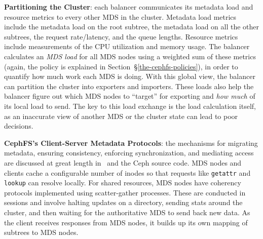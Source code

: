 \textbf{Partitioning the Cluster}: each balancer communicates its metadata load and resource metrics to every other MDS in the cluster. Metadata load metrics include the metadata load on the root subtree, the metadata load on all the other subtrees, the request rate/latency, and the queue lengths. Resource metrics include measurements of the CPU utilization and memory usage. The balancer calculates an {\it MDS load} for all MDS nodes using a weighted sum of these metrics (again, the policy is explained in Section~\S\ref{the-cephfs-policies}), in order to quantify how much work each MDS is doing. With this global view, the balancer can partition the cluster into exporters and importers. These loads also help the balancer figure out which MDS nodes to ``target'' for exporting and {\it how much} of its local load to send. The key to this load exchange is the load calculation itself, as an inaccurate view of another MDS or the cluster state can lead to poor decisions.

\textbf{CephFS's Client-Server Metadata Protocols}: the mechanisms for migrating metadata, ensuring consistency, enforcing synchronization, and mediating access are discussed at great length in~\cite{weil:phdthesis07} and the Ceph source code. MDS nodes and clients cache a configurable number of inodes so that requests like \texttt{getattr} and \texttt{lookup} can resolve locally.  For shared resources, MDS nodes have coherency protocols implemented using scatter-gather processes. These are conducted in sessions and involve halting updates on a directory, sending stats around the cluster, and then waiting for the authoritative MDS to send back new data. As the client receives responses from MDS nodes, it builds up its own mapping of subtrees to MDS nodes. 

